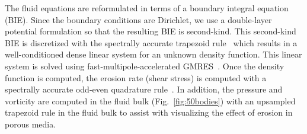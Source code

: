 \documentclass[preprint, 10pt]{elsarticle}
\begin{document}


The fluid equations are reformulated in terms of a boundary integral
equation (BIE).  Since the boundary conditions are Dirichlet, we use a
double-layer potential formulation so that the resulting BIE is
second-kind.  This second-kind BIE is discretized with the spectrally
accurate trapezoid rule~\cite{tre-wei2014} which results in a
well-conditioned dense linear system for an unknown density function.
This linear system is solved using fast-multipole-accelerated
GMRES~\cite{saa-sch1986}.  Once the density function is computed, the
erosion rate (shear stress) is computed with a spectrally accurate
odd-even quadrature rule~\cite{sid-isr1988}.  In addition, the pressure
and vorticity are computed in the fluid bulk (Fig.~\ref{fig:50bodies})
with an upsampled trapezoid rule in the fluid bulk to assist with
visualizing the effect of erosion in porous media.

%
\end{document}
